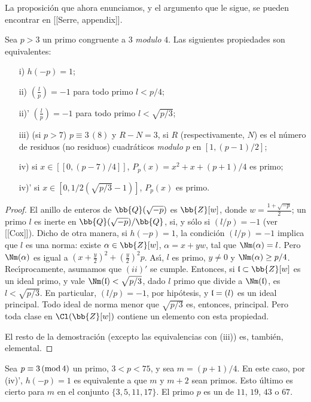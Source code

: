 

La proposici\'{o}n que ahora enunciamos, y el argumento que le sigue, se pueden
encontrar en [[Serre, appendix]].

\begin{propoEquivsNumClasUno}
Sea $p>3$ un primo congruente a $3$ \textit{modulo} $4$. Las siguientes propiedades
son equivalentes:

\begin{itemize}
\item[i)] $h(-p)=1$;
\item[ii)] $\left( \frac{l}{p} \right)=-1$ para todo primo $l<p/4$;
\item[ii)'] $\left( \frac{l}{p} \right)=-1$ para todo primo $l<\sqrt{p/3}$;
\item[iii)] (si $p>7$) $p\equiv 3\,(8)$ y $R-N=3$, si $R$ (respectivamente, $N$)
es el n\'{u}mero de residuos (no residuos) cuadr\'{a}ticos \textit{modulo} $p$ en
$[1,(p-1)/2]$;
\item[iv)] si $x\in[\![ 0,(p-7)/4 ]\!]$, $P_{p}(x)=x^{2}+x+(p+1)/4$ es primo;
\item[iv)'] si $x\in[0,1/2(\sqrt{p/3}-1)]$, $P_{p}(x)$ es primo.
\end{itemize}
\end{propoEquivsNumClasUno}

\begin{proof}
El anillo de enteros de $\bb{Q}(\sqrt{-p})$ es $\bb{Z}[w]$, donde
$w=\frac{1+\sqrt{-p}}{2}$; un primo $l$ es inerte en $\bb{Q}(\sqrt{-p})/\bb{Q}$,
si, y s\'{o}lo si $(l/p)=-1$ (ver [[Cox]]). Dicho de otra manera, si $h(-p)=1$,
la condici\'{o}n $(l/p)=-1$ implica que $l$ es una norma: existe
$\alpha\in\bb{Z}[w]$, $\alpha=x+yw$, tal que $\Nm(\alpha)=l$. Pero $\Nm(\alpha)$
es igual a $(x+\frac{y}{2})^{2}+(\frac{y}{2})^{2}p$. As\'{\i}, $l$ es primo,
$y\not =0$ y $\Nm(\alpha)\geq p/4$. Rec\'{\i}procamente, asumamos que $(ii)'$ se
cumple. Entonces, si $\frak{l}\subset\bb{Z}[w]$ es un ideal primo, y vale
$\Nm(\frak{l})<\sqrt{p/3}$, dado $l$ primo que divide a $\Nm(\frak{l})$, es
$l<\sqrt{p/3}$. En particular, $(l/p)=-1$, por hip\'{o}tesis, y $\frak{l}=(l)$ es
un ideal principal. Todo ideal de norma menor que $\sqrt{p/3}$ es, entonces,
principal. Pero toda clase en $\Cl(\bb{Z}[w])$ contiene un elemento con esta
propiedad.

El resto de la demostraci\'{o}n (excepto las equivalencias con (iii)) es,
tambi\'{e}n, elemental.
\end{proof}

Sea $p\equiv 3\,(\rm{mod}\,4)$ un primo, $3<p<75$, y sea $m=(p+1)/4$. En este caso,
por (iv)', $h(-p)=1$ es equivalente a que $m$ y $m+2$ sean primos. Esto \'{u}ltimo
es cierto para $m$ en el conjunto $\{3,5,11,17\}$. El primo $p$ es un de
$11$, $19$, $43$ o $67$.

